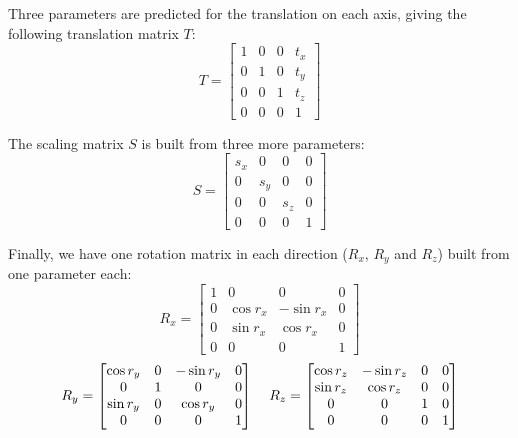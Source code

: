 Three parameters are predicted for the translation on each axis, giving the following translation matrix $T$:
\begin{equation*}
    T = 
    \begin{bmatrix}
        1 & 0 & 0 & t_x \\
        0 & 1 & 0 & t_y \\
        0 & 0 & 1 & t_z \\ 
        0 & 0 & 0 & 1
    \end{bmatrix}
\end{equation*}

The scaling matrix $S$ is built from three more parameters:
\begin{equation*}
    S = 
    \begin{bmatrix}
        s_x & 0 & 0 & 0 \\
        0 & s_y & 0 & 0 \\
        0 & 0 & s_z & 0 \\ 
        0 & 0 & 0 & 1
    \end{bmatrix}
\end{equation*}

Finally, we have one rotation matrix in each direction ($R_x$, $R_y$ and $R_z$) built from one parameter each:
\begin{equation*}
    R_x = 
    \begin{bmatrix}
        1 & 0 & 0 & 0 \\
        0 & \cos{r_x} & -\sin{r_x} & 0 \\
        0 & \sin{r_x} & \cos{r_x} & 0 \\ 
        0 & 0 & 0 & 1
    \end{bmatrix}
\end{equation*}
\begin{equation*}
    R_y = 
    \begin{bmatrix}
        \cos{r_y} & 0 & - \sin{r_y} & 0 \\
        0 & 1 & 0 & 0 \\
        \sin{r_y} & 0 & \cos{r_y} & 0 \\ 
        0 & 0 & 0 & 1
    \end{bmatrix}
    \mkern20mu
    R_z = 
    \begin{bmatrix}
        \cos{r_z} & -\sin{r_z} & 0 & 0 \\
        \sin{r_z} & \cos{r_z} & 0 & 0 \\
        0 & 0 & 1 & 0 \\ 
        0 & 0 & 0 & 1
    \end{bmatrix}
\end{equation*}

